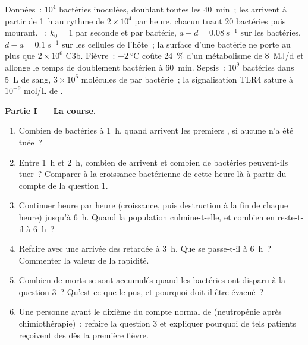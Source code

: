 \begin{problem}
\label{pb:b3:innate-immunity:1}
Données~: $10^{4}$ bactéries inoculées, doublant toutes les
\qty{40}{min}~; les  arrivent à partir de \qty{1}{h} au
rythme de $2\times 10^{4}$ par heure, chacun tuant $20$ bactéries puis
mourant. ~: $k_{0} = 1$ par seconde et par bactérie,
$a - d = \qty{0.08}{s^{-1}}$ sur les bactéries, $d - a =
\qty{0.1}{s^{-1}}$ sur les cellules de l'hôte~; la surface d'une
bactérie ne porte au plus que $2\times 10^{6}$ C3b. Fièvre~:
$+\qty{2}{\celsius}$ coûte \qty{24}{\%} d'un métabolisme de
\qty{8}{MJ/d} et allonge le temps de doublement bactérien à
\qty{60}{min}. Sepsis~: $10^{9}$ bactéries dans \qty{5}{L} de sang,
$3\times 10^{6}$ molécules de  par bactérie~; la
signalisation TLR4 sature à $10^{-9}$ mol/L de .

\medskip
\noindent\textbf{Partie I --- La course.}
\begin{enumerate}
  \item Combien de bactéries à \qty{1}{h}, quand arrivent les premiers
        , si aucune n'a été tuée~?
  \item Entre \qty{1}{h} et \qty{2}{h}, combien de  arrivent
        et combien de bactéries peuvent-ils tuer~? Comparer à la
        croissance bactérienne de cette heure-là à partir du compte de
        la question 1.
  \item Continuer heure par heure (croissance, puis destruction à la fin
        de chaque heure) jusqu'à \qty{6}{h}. Quand la population
        culmine-t-elle, et combien en reste-t-il à \qty{6}{h}~?
  \item Refaire avec une arrivée des  retardée à \qty{3}{h}.
        Que se passe-t-il à \qty{6}{h}~? Commenter la valeur de la
        rapidité.
  \item Combien de  morts se sont accumulés quand les
        bactéries ont disparu à la question 3~? Qu'est-ce que le pus, et
        pourquoi doit-il être évacué~?
  \item Une personne ayant le dixième du compte normal de 
        (neutropénie après chimiothérapie)~: refaire la question 3 et
        expliquer pourquoi de tels patients reçoivent des 
        dès la première fièvre.
\end{enumerate}


\end{problem}
